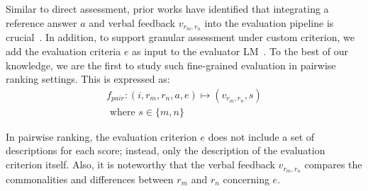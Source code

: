\documentclass[11pt]{article}
\begin{document}
Similar to direct assessment, prior works have identified that integrating a reference answer $a$ and verbal feedback ${v}_{{r}_{m},{r}_{n}}$ into the evaluation pipeline is crucial~\citep{zheng2023judging,alpaca_eval,li2023generative}. In addition, to support granular assessment under custom criterion, we add the evaluation criteria $e$ as input to the evaluator LM~\citep{ye2023flask,kim2023prometheus}. To the best of our knowledge, we are the first to study such fine-grained evaluation in pairwise ranking settings. This is expressed as: 
\begin{equation}
\begin{aligned}
    {f}_{pair}: (i, r_m, r_n, a, e) \mapsto ({v}_{{r}_{m},{r}_{n}}, s)\\ 
    \text{ where } s \in \{m, n\}   
\end{aligned}
\end{equation}


In pairwise ranking, the evaluation criterion $e$ does not include a set of descriptions for each score; instead, only the description of the evaluation criterion itself. Also, it is noteworthy that the verbal feedback ${v}_{{r}_{m},{r}_{n}}$ compares the commonalities and differences between ${r}_{m}$ and ${r}_{n}$ concerning $e$.


\end{document}
